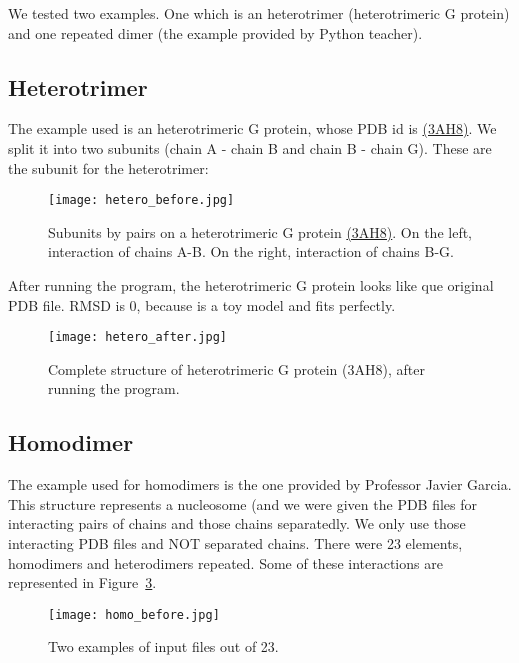 \documentclass[a4paper,10pt]{report}
\begin{document}
We tested two examples. One which is an heterotrimer (heterotrimeric G protein) and one repeated dimer (the example provided by Python teacher).

\subsection{Heterotrimer}

The example used is an heterotrimeric G protein, whose PDB id is \href{https://www.rcsb.org/structure/3ah8}{(3AH8)}. We split it into two subunits (chain A - chain B and chain B - chain G). These are the subunit for the heterotrimer:

\begin{figure}[h]
\centering
\texttt{[image: hetero\_before.jpg]}
\caption{Subunits by pairs on a heterotrimeric G protein \href{https://www.rcsb.org/structure/3ah8}{(3AH8)}. On the left, interaction of chains A-B. On the right, interaction of chains B-G.}
\label{fig:1}
\end{figure}

\noindent
After running the program, the heterotrimeric G protein looks like que original PDB file. RMSD is 0, because is a toy model and fits perfectly.

\begin{figure}[h]
\centering
\texttt{[image: hetero\_after.jpg]}
\caption{Complete structure of heterotrimeric G protein (3AH8), after running the program.}
\label{fig:2}
\end{figure}

\newpage

\subsection{Homodimer}

The example used for homodimers is the one provided by Professor Javier Garcia. This structure represents a nucleosome (and we were given the PDB files for interacting pairs of chains and those chains separatedly. We only use those interacting PDB files and NOT separated chains. There were 23 elements, homodimers and heterodimers repeated. Some of these interactions are represented in Figure~\ref{fig:3}.\\

\begin{figure}[h]
\texttt{[image: homo\_before.jpg]}
\centering
\caption{Two examples of input files out of 23.}
\label{fig:3}
\end{figure}
\end{document}
